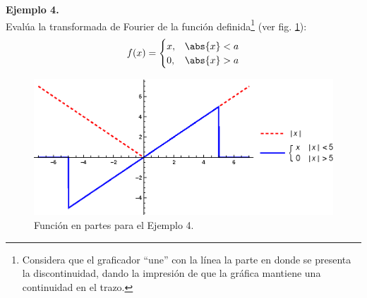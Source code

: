 \noindent
\textbf{Ejemplo 4.}
\\
Evalúa la transformada de Fourier de la función definida\footnote{Considera que el graficador \enquote{une} con la línea la parte en donde se presenta la discontinuidad, dando la impresión de que la gráfica mantiene una continuidad en el trazo.} (ver fig. \ref{fig:figura_plot_Ejemplo_04_01}):
\begin{align*}
f (x) = \begin{cases}
x, & \abs{x} < a \\
0, & \abs{x} > a
\end{cases}
\end{align*}
\begin{figure}[H]
    \centering
    \includegraphics[scale=1]{Imagenes/Plot_Ejemplo_04_01.eps}
    \caption{Función en partes para el Ejemplo 4.}
    \label{fig:figura_plot_Ejemplo_04_01}
\end{figure}

